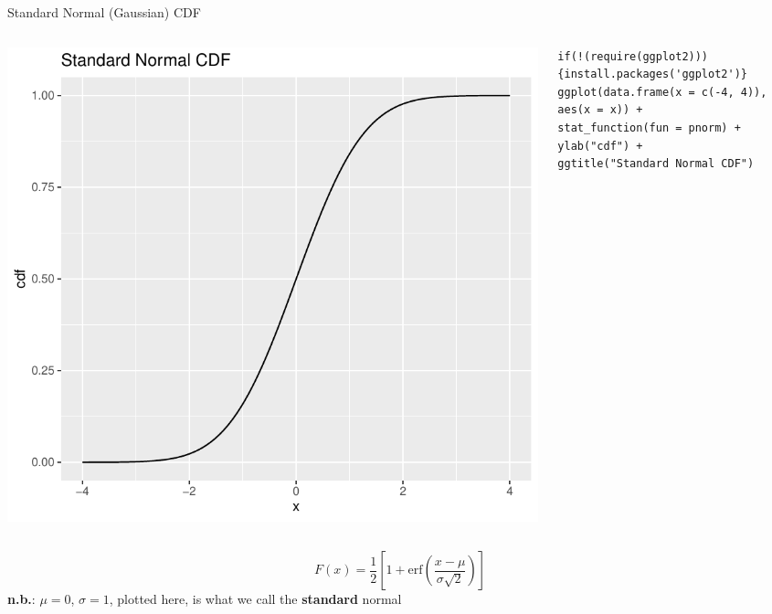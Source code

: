 \begin{frame}[fragile]{Standard Normal (Gaussian) CDF}
\begin{columns}
\begin{column}{0.5\textwidth}
\begin{center}
\includegraphics[height=.5\textheight]{normal-cdf} 
\end{center}
\end{column}
\begin{column}{0.5\textwidth} 
\begin{lstlisting}
if(!(require(ggplot2))){install.packages('ggplot2')}
ggplot(data.frame(x = c(-4, 4)), aes(x = x)) +
stat_function(fun = pnorm) +
ylab("cdf") +
ggtitle("Standard Normal CDF") 
\end{lstlisting}
\end{column}
\end{columns}
\[
F\left(x\right) = \frac{1}{2} \left[ 1 + \text{erf}\left(\frac{x-\mu}{\sigma \sqrt{2}} \right)\right]
\]
{\bf n.b.}: $\mu=0$, $\sigma=1$, plotted here, is what we call the {\bf standard} normal
\end{frame}




